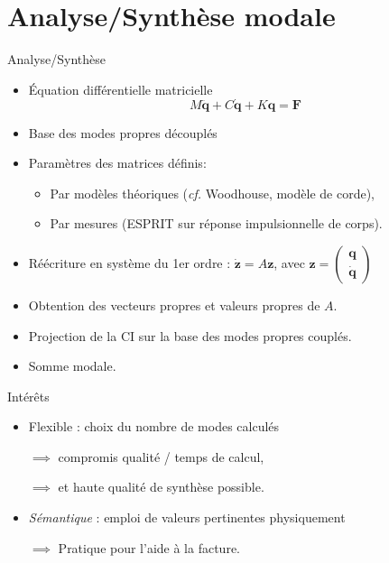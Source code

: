 \section{Analyse/Synthèse modale}

\begin{frame}{Analyse/Synthèse}
 \begin{itemize}
  \item Équation différentielle matricielle
    \[ M \ddot{\bm{q}} + C \dot{\bm{q}} + K \bm{q} = \bm{F} \]
  \item Base des modes propres découplés
  \item Paramètres des matrices définis:
    \begin{itemize}
     \item Par modèles théoriques (\emph{cf.} Woodhouse, modèle de corde),
     \item Par mesures (ESPRIT sur réponse impulsionnelle de corps).
    \end{itemize}
  \item Réécriture en système du 1er ordre : \( \dot{\bm{z}} = A\bm{z} \), avec
    \( \bm{z} = \begin{pmatrix}
                 \bm{q} \\
		 \dot{\bm{q}}
                \end{pmatrix} \)
  \item Obtention des vecteurs propres et valeurs propres de \( A \).
  \item Projection de la CI sur la base des modes propres couplés.
  \item Somme modale.
 \end{itemize}
\end{frame}

\begin{frame}{Intérêts}
 \begin{itemize}
  \item Flexible : choix du nombre de modes calculés
  \item[\( \implies \)] compromis qualité / temps de calcul,
  \item[\( \implies \)] et haute qualité de synthèse possible.
  \item \emph{Sémantique} : emploi de valeurs pertinentes physiquement
  \item[\( \implies \)] Pratique pour l'aide à la facture.
 \end{itemize}
\end{frame}
